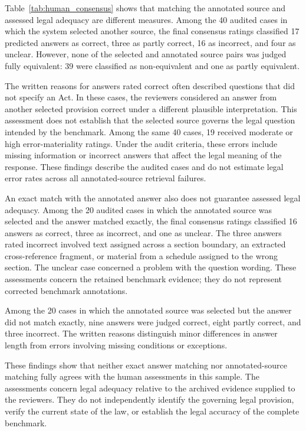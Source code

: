 \documentclass[pdflatex,sn-basic]{sn-jnl}%
\theoremstyle{thmstyleone}%
\theoremstyle{thmstyletwo}%
\theoremstyle{thmstylethree}%
\begin{document}
Table~\ref{tab:human_consensus} shows that matching the annotated source and
assessed legal adequacy are different measures. Among the 40 audited cases in
which the system selected another source, the final consensus ratings
classified 17 predicted answers as correct, three as partly correct, 16 as
incorrect, and four as unclear. However, none of the selected and annotated
source pairs was judged fully equivalent: 39 were classified as
non-equivalent and one as partly equivalent.

The written reasons for answers rated correct often described questions that
did not specify an Act. In these cases, the reviewers considered an answer
from another selected provision correct under a different plausible
interpretation. This assessment does not establish that the selected source
governs the legal question intended by the benchmark. Among the same 40
cases, 19 received moderate or high error-materiality ratings. Under the
audit criteria, these errors include missing information or incorrect answers
that affect the legal meaning of the response. These findings describe the
audited cases and do not estimate legal error rates across all
annotated-source retrieval failures.

An exact match with the annotated answer also does not guarantee assessed
legal adequacy. Among the 20 audited cases in which the annotated source was
selected and the answer matched exactly, the final consensus ratings
classified 16 answers as correct, three as incorrect, and one as unclear.
The three answers rated incorrect involved text assigned across a section
boundary, an extracted cross-reference fragment, or material from a schedule
assigned to the wrong section. The unclear case concerned a problem with the
question wording. These assessments concern the retained benchmark evidence;
they do not represent corrected benchmark annotations.

Among the 20 cases in which the annotated source was selected but the answer
did not match exactly, nine answers were judged correct, eight partly correct,
and three incorrect. The written reasons distinguish minor differences in
answer length from errors involving missing conditions or exceptions.

These findings show that neither exact answer matching nor annotated-source
matching fully agrees with the human assessments in this sample. The
assessments concern legal adequacy relative to the archived evidence supplied
to the reviewers. They do not independently identify the governing legal
provision, verify the current state of the law, or establish the legal
accuracy of the complete benchmark.
\end{document}
